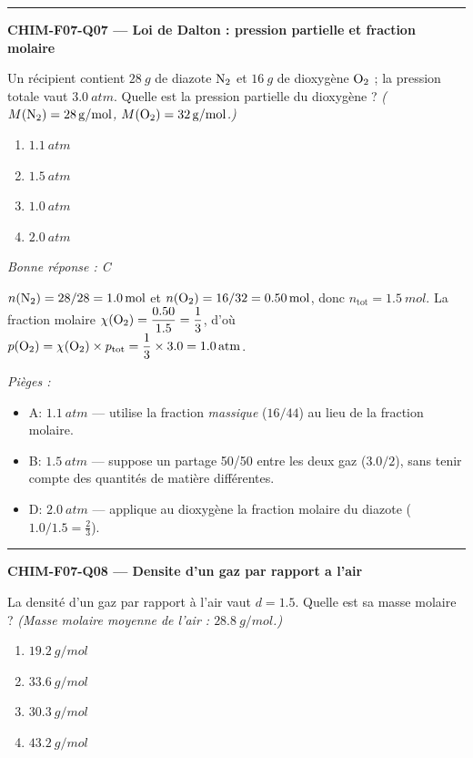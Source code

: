 \documentclass[11pt,a4paper]{article}
\begin{document}
\vspace{8pt}\hrule\vspace{8pt}
\noindent\textbf{CHIM-F07-Q07 --- Loi de Dalton : pression partielle et fraction molaire}\par
Un récipient contient $\qty{28}{g}$ de diazote $\ce{N2}$ et $\qty{16}{g}$ de dioxygène $\ce{O2}$ ; la pression totale vaut $\qty{3.0}{atm}$. Quelle est la pression partielle du dioxygène ? \textit{($M(\ce{N2})=\qty{28}{g/mol}$, $M(\ce{O2})=\qty{32}{g/mol}$.)}
\begin{enumerate}[label=\Alph*)]
\item $\qty{1.1}{atm}$
\item $\qty{1.5}{atm}$
\item $\qty{1.0}{atm}$
\item $\qty{2.0}{atm}$
\end{enumerate}
\textit{Bonne réponse : C}\par
$n(\ce{N2})=28/28=\qty{1.0}{mol}$ et $n(\ce{O2})=16/32=\qty{0.50}{mol}$, donc $n_{\text{tot}}=\qty{1.5}{mol}$. La fraction molaire $\chi(\ce{O2})=\dfrac{\num{0.50}}{\num{1.5}}=\dfrac{1}{3}$, d'où $p(\ce{O2})=\chi(\ce{O2})\times p_{\text{tot}}=\dfrac{1}{3}\times\num{3.0}=\qty{1.0}{atm}$.\par
\textit{Pièges :}
\begin{itemize}
\item A: $\qty{1.1}{atm}$ --- utilise la fraction \emph{massique} ($16/44$) au lieu de la fraction molaire.
\item B: $\qty{1.5}{atm}$ --- suppose un partage 50/50 entre les deux gaz ($\num{3.0}/2$), sans tenir compte des quantités de matière différentes.
\item D: $\qty{2.0}{atm}$ --- applique au dioxygène la fraction molaire du diazote ($\num{1.0}/\num{1.5}=\tfrac{2}{3}$).
\end{itemize}
\vspace{8pt}\hrule\vspace{8pt}
\noindent\textbf{CHIM-F07-Q08 --- Densite d'un gaz par rapport a l'air}\par
La densité d'un gaz par rapport à l'air vaut $d=\num{1.5}$. Quelle est sa masse molaire ? \textit{(Masse molaire moyenne de l'air : $\qty{28.8}{g/mol}$.)}
\begin{enumerate}[label=\Alph*)]
\item $\qty{19.2}{g/mol}$
\item $\qty{33.6}{g/mol}$
\item $\qty{30.3}{g/mol}$
\item $\qty{43.2}{g/mol}$
\end{enumerate}
\end{document}
